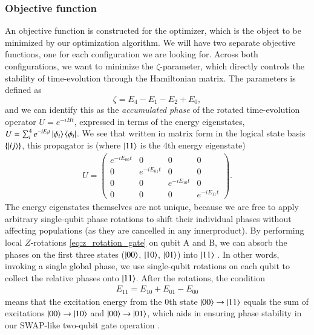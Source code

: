 \documentclass{subfiles}
\begin{document}
\subsubsection{Objective function}
An objective function is constructed for the optimizer, which is the object to be minimized by our optimization algorithm. We will have two separate objective functions, one for each configuration we are looking for. Across both configurations, we want to minimize the $\zeta$-parameter, which directly controls the stability of time-evolution through the Hamiltonian matrix. The parameters is defined as 
\begin{equation}
    \zeta = E_4 - E_1 - E_2 + E_0,\label{eq:zeta}
\end{equation}
and we can identify this as the \emph{accumulated phase} of the rotated time-evolution operator $U = e^{-iHt}$, expressed in terms of the energy eigenstates, $U = \sum_i^4 e^{-iE_it}\ket{\phi_i}\bra{\phi_i}$. We see that written in matrix form in the logical state basis $\{\ket{ij}\}$, this propagator is (where $\ket{11}$ is the 4th energy eigenstate)
\begin{align*}
    U = \begin{pmatrix}
        e^{-iE_{00}t} & 0 & 0 & 0 \\
        0 & e^{-iE_{01}t} & 0 & 0 \\
        0 & 0 & e^{-iE_{10}t} & 0 \\
        0 & 0 & 0 & e^{-iE_{11}t}
    \end{pmatrix}.
\end{align*}
The energy eigenstates themselves are not unique, because we are free to apply arbitrary single-qubit phase rotations to shift their individual phases without affecting populations (as they are cancelled in any innerproduct). By performing local $Z$-rotations \eqref{eq:z_rotation_gate} on qubit A and B, we can absorb the phases on the first three states ($\ket{00}$, $\ket{10}$, $\ket{01}$) into $\ket{11}$ \cite{nielsen2010quantum}. In other words, invoking a single global phase, we use single-qubit rotations on each qubit to collect the relative phases onto $\ket{11}$. After the rotations, the condition
\begin{align*}
    E_{11} = E_{10} + E_{01} - E_{00}
\end{align*}
means that the excitation energy from the 0th state $\ket{00}\to\ket{11}$ equals the sum of excitations $\ket{00}\to\ket{10}$ and $\ket{00}\to\ket{01}$, which aids in ensuring phase stability in our SWAP-like two-qubit gate operation \cite{ku2020suppression}. 
\\
\end{document}
